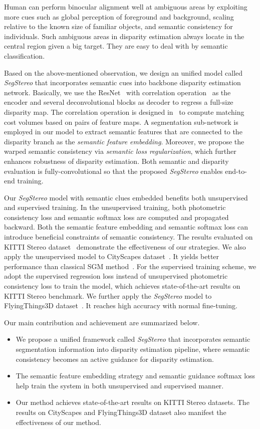 \documentclass[runningheads]{llncs}
\begin{document}
Human can perform binocular alignment well at ambiguous areas by exploiting more cues such as global perception of foreground and background, scaling relative to the known size of familiar objects, and semantic consistency for individuals. Such ambiguous areas in disparity estimation always locate in the central region given a big target. They are easy to deal with by semantic classification. 

Based on the above-mentioned observation, we design an unified model called \emph{SegStereo} that incorporates semantic cues into backbone disparity estimation network. Basically, we use the ResNet~\cite{he2016deep} with correlation operation~\cite{dosovitskiy2015flownet} as the encoder and several deconvolutional blocks as decoder to regress a full-size disparity map. The correlation operation is designed in~\cite{dosovitskiy2015flownet} to compute matching cost volumes based on pairs of feature maps. A segmentation sub-network is employed in our model to extract semantic features that are connected to the disparity branch as the \emph{semantic feature embedding}. Moreover, we propose the warped semantic consistency via \emph{semantic loss regularization}, which further enhances robustness of disparity estimation. Both semantic and disparity evaluation is fully-convolutional so that the proposed \emph{SegStereo} enables end-to-end training. 

Our \emph{SegStereo} model with semantic clues embedded benefits both unsupervised and supervised training. In the unsupervised training, both photometric consistency loss and semantic softmax loss are computed and propagated backward. Both the semantic feature embedding and semantic softmax loss can introduce beneficial constraints of semantic consistency. The results evaluated on KITTI Stereo dataset~\cite{Menze2015CVPR} demonstrate the effectiveness of our strategies. We also apply the unsupervised model to CityScapes dataset~\cite{cordts2016cityscapes}. It yields better performance than classical SGM method~\cite{hirschmuller2008stereo}. For the supervised training scheme, we adopt the supervised regression loss instead of unsupervised photometric consistency loss to train the model, which achieves state-of-the-art results on KITTI Stereo benchmark. We further apply the \emph{SegStereo} model to FlyingThings3D dataset~\cite{mayer2016large}. It reaches high accuracy with normal fine-tuning. 

Our main contribution and achievement are summarized below.
\begin{itemize}
   \item
   We propose a unified framework called \emph{SegStereo} that incorporates semantic segmentation information into disparity estimation pipeline, where semantic consistency becomes an active guidance for disparity estimation.
   \item
   The semantic feature embedding strategy and semantic guidance softmax loss help train the system in both unsupervised and supervised manner. 
   \item
   Our method achieves state-of-the-art results on KITTI Stereo datasets. The results on CityScapes and FlyingThings3D dataset also manifest the effectiveness of our method. 
\end{itemize}
\end{document}
